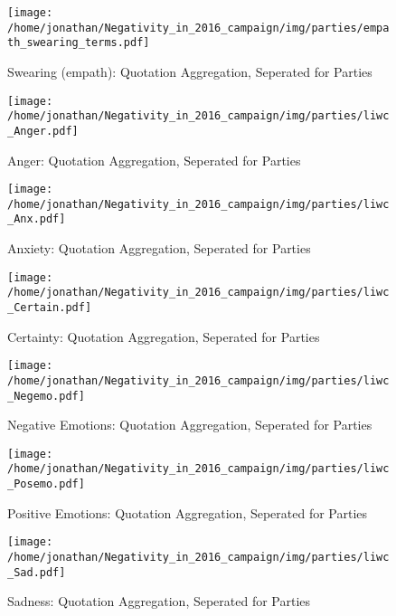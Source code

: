 \begin{figure}[h]\centering
	\texttt{[image: /home/jonathan/Negativity\_in\_2016\_campaign/img/parties/empath\_swearing\_terms.pdf]}
	\caption{Swearing (empath): Quotation Aggregation, Seperated for Parties}
	\label{fig: parties_Swearing (empath)}
\end{figure}

\begin{figure}[h]\centering
	\texttt{[image: /home/jonathan/Negativity\_in\_2016\_campaign/img/parties/liwc\_Anger.pdf]}
	\caption{Anger: Quotation Aggregation, Seperated for Parties}
	\label{fig: parties_Anger}
\end{figure}

\begin{figure}[h]\centering
	\texttt{[image: /home/jonathan/Negativity\_in\_2016\_campaign/img/parties/liwc\_Anx.pdf]}
	\caption{Anxiety: Quotation Aggregation, Seperated for Parties}
	\label{fig: parties_Anxiety}
\end{figure}

\begin{figure}[h]\centering
	\texttt{[image: /home/jonathan/Negativity\_in\_2016\_campaign/img/parties/liwc\_Certain.pdf]}
	\caption{Certainty: Quotation Aggregation, Seperated for Parties}
	\label{fig: parties_Certainty}
\end{figure}

\begin{figure}[h]\centering
	\texttt{[image: /home/jonathan/Negativity\_in\_2016\_campaign/img/parties/liwc\_Negemo.pdf]}
	\caption{Negative Emotions: Quotation Aggregation, Seperated for Parties}
	\label{fig: parties_Negative Emotions}
\end{figure}

\begin{figure}[h]\centering
	\texttt{[image: /home/jonathan/Negativity\_in\_2016\_campaign/img/parties/liwc\_Posemo.pdf]}
	\caption{Positive Emotions: Quotation Aggregation, Seperated for Parties}
	\label{fig: parties_Positive Emotions}
\end{figure}

\begin{figure}[h]\centering
	\texttt{[image: /home/jonathan/Negativity\_in\_2016\_campaign/img/parties/liwc\_Sad.pdf]}
	\caption{Sadness: Quotation Aggregation, Seperated for Parties}
	\label{fig: parties_Sadness}
\end{figure}

